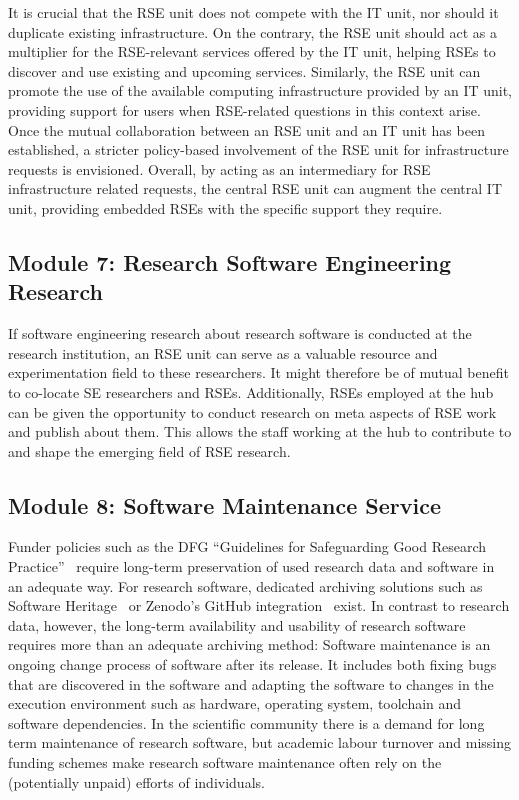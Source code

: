 \documentclass[a4paper]{article}
\begin{document}
It is crucial that the RSE unit does not compete with the IT unit, nor should it duplicate existing infrastructure.
On the contrary, the RSE unit should act as a multiplier for the RSE-relevant services offered by the IT unit, helping RSEs to discover and use existing and upcoming services.
Similarly, the RSE unit can promote the use of the available computing infrastructure provided by an IT unit, providing support for users when RSE-related questions in this context arise.
Once the mutual collaboration between an RSE unit and an IT unit has been established, a stricter policy-based involvement of the RSE unit for infrastructure requests is envisioned.
Overall, by acting as an intermediary for RSE infrastructure related requests, the central RSE unit can augment the central IT unit, providing embedded RSEs with the specific support they require.

\subsection{Module 7: Research Software Engineering Research}%
\label{sec:rseresearch}

If software engineering research about research software is conducted at the research institution, an RSE unit can serve as a valuable resource and experimentation field to these researchers.
It might therefore be of mutual benefit to co-locate SE researchers and RSEs.
Additionally, RSEs employed at the hub can be given the opportunity to conduct research on meta aspects of RSE work and publish about them.
This allows the staff working at the hub to contribute to and shape the emerging field of RSE research.

\subsection{Module 8: Software Maintenance Service}%
\label{sec:maintenance}

Funder policies such as the DFG “Guidelines for Safeguarding Good Research Practice”~\autocite{dfg_gsp} require long-term preservation of used research data and software in an adequate way.
For research software, dedicated archiving solutions such as Software Heritage~\autocite{DiCosmo2020,DiCosmo2023} or Zenodo's GitHub integration~\autocite{GitHubZenodo} exist.
In contrast to research data, however, the long-term availability and usability of research software requires more than an adequate archiving method:
Software maintenance is an ongoing change process of software after its release.
It includes  both fixing bugs that are discovered in the software and adapting the software to changes in the execution environment such as hardware, operating system, toolchain and software dependencies.
In the scientific community there is a demand for long term maintenance of research software,
 but academic labour turnover and missing funding schemes make research software maintenance often rely on the (potentially unpaid) efforts of individuals.
\end{document}
